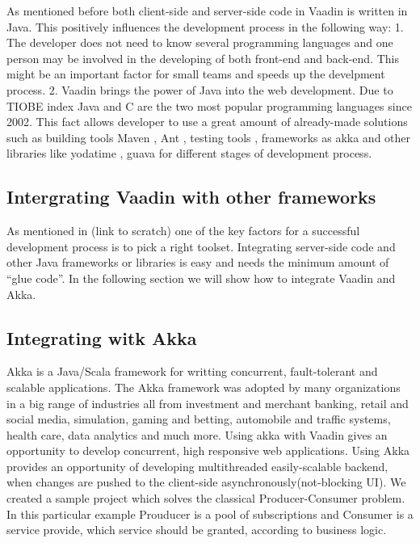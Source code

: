 	 
	 As mentioned before both client-side and server-side code in Vaadin is written
	 in Java. This positively influences the development process in the following
	 way:
	  1. The developer does not need to know several programming languages and one
	  person may be involved in the developing of both front-end and back-end. This
	  might be an important factor for small teams and speeds up the develpment
	  process.
	  2. Vaadin brings the power of Java into the web development. Due to
	  TIOBE index \cite{tiobeIndex} Java and C are the two most popular programming
	  languages since 2002. This fact allows developer to use a great amount of
	  already-made solutions such as building tools Maven \cite{maven}, Ant
	  \cite{ant}, testing tools \cite{junit}, frameworks as akka \cite{akka} and
	  other libraries like yodatime \cite{yodatime}, guava \cite{guava} for different stages of development
	  process.
	  
	\subsection {Intergrating Vaadin with other frameworks}
	  As mentioned in (link to scratch) one of the key factors for a successful
	  development process is to pick a right toolset. Integrating server-side
	  code and other Java frameworks or libraries is easy and needs the minimum
	  amount of ``glue code''. In the following section we will show how to
	  integrate Vaadin and Akka.
	   
	  \subsection {Integrating witk Akka}
	  Akka is a Java/Scala framework for writting concurrent, fault-tolerant and
	  scalable applications. The Akka framework was adopted by many organizations
	  in a big range of industries all from investment and merchant banking, retail and social media,
	   simulation, gaming and betting, automobile and traffic systems, health care,
	   data analytics and much more\cite {akkakUseCases}. Using akka with Vaadin
	   gives an opportunity to develop concurrent, high responsive web
	   applications. Using Akka provides an
	   opportunity of developing multithreaded easily-scalable backend, when
	   changes are pushed to the client-side asynchronously(not-blocking UI). 
	   We created a sample project which solves the classical Producer-Consumer
	   problem. In this particular example Prouducer is a pool of subscriptions and
	   Consumer is a service provide, which service should be granted, according to
	   business logic.
	   
